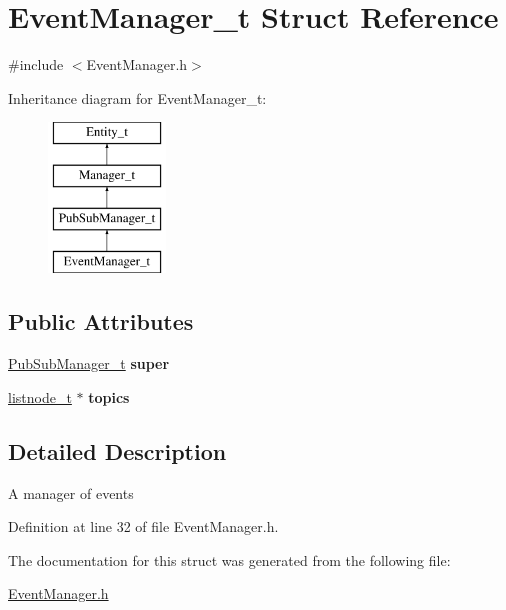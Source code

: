 \hypertarget{structEventManager__t}{
\section{EventManager\_\-t Struct Reference}
\label{structEventManager__t}
}


{\ttfamily \#include $<$EventManager.h$>$}

Inheritance diagram for EventManager\_\-t:\begin{figure}[H]
\begin{center}
\leavevmode
\includegraphics[height=4.000000cm]{structEventManager__t}
\end{center}
\end{figure}
\subsection*{Public Attributes}
\begin{DoxyCompactItemize}
\item 
\hypertarget{structEventManager__t_ad6ab19e64bfdd71d76a3f7e9cbf1ccb5}{
\hyperlink{structPubSubManager__t}{PubSubManager\_\-t} {\bfseries super}}
\label{structEventManager__t_ad6ab19e64bfdd71d76a3f7e9cbf1ccb5}

\item 
\hypertarget{structEventManager__t_abcba73273dcc0d36ff047f22f6400d3d}{
\hyperlink{structlnode}{listnode\_\-t} $\ast$ {\bfseries topics}}
\label{structEventManager__t_abcba73273dcc0d36ff047f22f6400d3d}

\end{DoxyCompactItemize}


\subsection{Detailed Description}
A manager of events 

Definition at line 32 of file EventManager.h.



The documentation for this struct was generated from the following file:\begin{DoxyCompactItemize}
\item 
\hyperlink{EventManager_8h}{EventManager.h}\end{DoxyCompactItemize}
